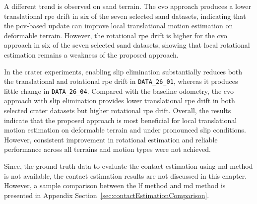 \documentclass[report.tex]{subfiles}
\begin{document}
        A different trend is observed on sand terrain. The \gls{cvo} approach produces a lower translational \gls{rpe} drift in six of the seven selected sand datasets, indicating that the \gls{pcv}-based update can improve local translational motion estimation on deformable terrain. However, the rotational \gls{rpe} drift is higher for the \gls{cvo} approach in six of the seven selected sand datasets, showing that local rotational estimation remains a weakness of the proposed approach.

        In the crater experiments, enabling slip elimination substantially reduces both the translational and rotational \gls{rpe} drift in \texttt{DATA\_26\_01}, whereas it produces little change in \texttt{DATA\_26\_04}. Compared with the baseline odometry, the \gls{cvo} approach with slip elimination provides lower translational \gls{rpe} drift in both selected crater datasets but higher rotational \gls{rpe} drift. Overall, the results indicate that the proposed approach is most beneficial for local translational motion estimation on deformable terrain and under pronounced slip conditions. However, consistent improvement in rotational estimation and reliable performance across all terrains and motion types were not achieved.
        
        Since, the ground truth data to evaluate the contact estimation using \gls{md} method is not available, the contact estimation results are not discussed in this chapter. However, a sample comparison between the \gls{lf} method and \gls{md} method is presented in Appendix Section~\ref{sec:contactEstimationComparison}.
\end{document}
